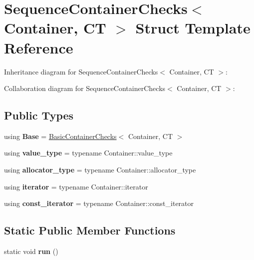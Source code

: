 \hypertarget{struct_sequence_container_checks}{}\section{Sequence\+Container\+Checks$<$ Container, CT $>$ Struct Template Reference}
\label{struct_sequence_container_checks}


Inheritance diagram for Sequence\+Container\+Checks$<$ Container, CT $>$\+:


Collaboration diagram for Sequence\+Container\+Checks$<$ Container, CT $>$\+:
\subsection*{Public Types}
\begin{DoxyCompactItemize}
\item 
\mbox{\label{struct_sequence_container_checks_a34c0f6de09ebdedd6d8165fe679c8e42}} 
using {\bfseries Base} = \mbox{\hyperlink{struct_iterator_debug_checks_1_1_basic_container_checks}{Basic\+Container\+Checks}}$<$ Container, CT $>$
\item 
\mbox{\label{struct_sequence_container_checks_a3d1b180c0421e36f712a75e9a70b678b}} 
using {\bfseries value\+\_\+type} = typename Container\+::value\+\_\+type
\item 
\mbox{\label{struct_sequence_container_checks_aa7c1b6ef8b541dd14e9baaa60e0022cf}} 
using {\bfseries allocator\+\_\+type} = typename Container\+::allocator\+\_\+type
\item 
\mbox{\label{struct_sequence_container_checks_a4b5d69b6846d703e71136a15c660f543}} 
using {\bfseries iterator} = typename Container\+::iterator
\item 
\mbox{\label{struct_sequence_container_checks_acb4083e235aeccfa20b4ee34f384d32f}} 
using {\bfseries const\+\_\+iterator} = typename Container\+::const\+\_\+iterator
\end{DoxyCompactItemize}
\subsection*{Static Public Member Functions}
\begin{DoxyCompactItemize}
\item 
\mbox{\label{struct_sequence_container_checks_ad4146abcccbeb10a865dc06034326e01}} 
static void {\bfseries run} ()
\end{DoxyCompactItemize}
